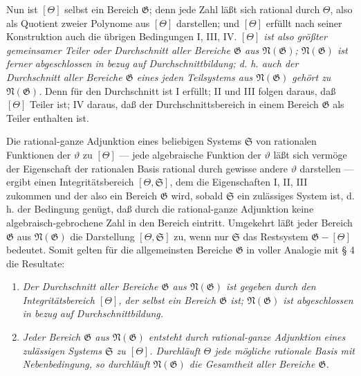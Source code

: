 Nun ist $[\Theta]$ selbst ein Bereich $\mathfrak G$; denn jede Zahl läßt sich
rational durch $\Theta$, also als Quotient zweier Polynome aus $[\Theta]$
darstellen; und $[\Theta]$ erfüllt nach seiner Konstruktion auch die übrigen
Bedingungen I, III, IV. \emph{$[\Theta]$ ist also größter gemeinsamer Teiler
oder Durchschnitt aller Bereiche $\mathfrak G$ aus $\mathfrak N(\mathfrak G)$;
$\mathfrak N(\mathfrak G)$ ist ferner abgeschlossen in bezug auf
Durchschnittbildung; d. h. auch der Durchschnitt aller Bereiche $\mathfrak G$
eines jeden Teilsystems aus $\mathfrak N(\mathfrak G)$ gehört zu
$\mathfrak N(\mathfrak G)$.} Denn für den Durchschnitt ist I erfüllt; II und
III folgen daraus, daß $[\Theta]$ Teiler ist; IV daraus, daß der
Durchschnittsbereich in einem Bereich $\mathfrak G$ als Teiler enthalten ist.

Die rational-ganze Adjunktion eines beliebigen Systems $\mathfrak S$ von
rationalen Funktionen der $\vartheta$ zu $[\Theta]$ --- jede algebraische
Funktion der $\vartheta$ läßt sich vermöge der Eigenschaft der rationalen Basis
rational durch gewisse andere $\vartheta$ darstellen --- ergibt einen
Integritätsbereich $[\Theta,\mathfrak S]$, dem die Eigenschaften I, II, III
zukommen und der also ein Bereich $\mathfrak G$ wird, sobald $\mathfrak S$ ein
\glqq{}zulässiges System\grqq{} ist, d. h. der Bedingung genügt, daß durch die
rational-ganze Adjunktion keine algebraisch-gebrochene Zahl in den Bereich
eintritt. Umgekehrt läßt jeder Bereich $\mathfrak G$ aus
$\mathfrak N(\mathfrak G)$ die Darstellung $[\Theta,\mathfrak S]$ zu, wenn nur
$\mathfrak S$ das Restsystem $\mathfrak G-[\Theta]$ bedeutet. Somit gelten für
die allgemeinsten Bereiche $\mathfrak G$ in voller Analogie mit § 4 die
Resultate:
\begin{enumerate}
\item[a)] \emph{Der Durchschnitt aller Bereiche $\mathfrak G$ aus
$\mathfrak N(\mathfrak G)$ ist gegeben durch den Integritätsbereich $[\Theta]$,
der selbst ein Bereich $\mathfrak G$ ist; $\mathfrak N(\mathfrak G)$ ist
abgeschlossen in bezug auf Durchschnittbildung.}
\item[b)] \emph{Jeder Bereich $\mathfrak G$ aus $\mathfrak N(\mathfrak G)$
entsteht durch rational-ganze Adjunktion eines zulässigen Systems $\mathfrak S$
zu $[\Theta]$. Durchläuft $\Theta$ jede mögliche rationale Basis mit
Nebenbedingung, so durchläuft $\mathfrak N(\mathfrak G)$ die Gesamtheit aller
Bereiche $\mathfrak G$.}
\end{enumerate}

